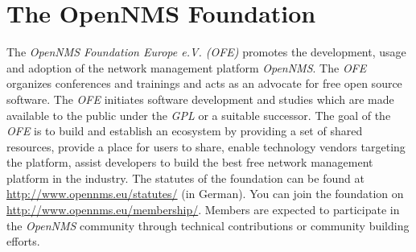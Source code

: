 \section{The OpenNMS Foundation}
The \emph{OpenNMS Foundation Europe e.V. (OFE)} promotes the development, usage and adoption of the network management platform \emph{OpenNMS}. The \emph{OFE} organizes conferences and trainings and acts as an advocate for free open source software. The \emph{OFE} initiates software development and studies which are made available to the public under the \emph{GPL} or a suitable successor. The goal of the \emph{OFE} is to build and establish an ecosystem by providing a set of shared resources, provide a place for users to share, enable technology vendors targeting the platform, assist developers to build the best free network management platform in the industry. The statutes of the foundation can be found at \url{http://www.opennms.eu/statutes/} (in German). You can join the foundation on \url{http://www.opennms.eu/membership/}. Members are expected to participate in the \emph{OpenNMS} community through technical contributions or community building efforts.

